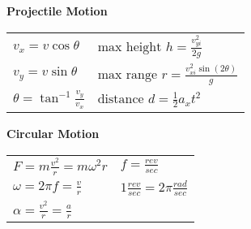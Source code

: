\documentclass[12pt]{article}
\begin{document}
\begin{minipage}[t]{.5\textwidth}
\textbf{\large{Projectile Motion}} \\[6pt]
	\begin{tabular}{p{3cm} p{6cm}}
	$v_x = v \cos \theta$ & $\text{max height   } h = \frac{v_{yi}^2}{2g}$ \\[6pt]
	$v_y = v \sin \theta$ & $\text{max range   } r = \frac{v_{xi}^2 \sin(2\theta)}{g}$ \\[6pt]
		
	$\theta = \tan ^{-1} \frac{v_y}{v_x}$ & $\text{distance    } d = \tfrac{1}{2} a_x t^2$ \\[6pt]
	\end{tabular}

\end{minipage}\vspace{12pt}

\begin{minipage}[t]{.5\textwidth}
\textbf{\large{Circular Motion}} \\[6pt]
\begin{tabular}{p{4cm} p{6cm}}
	$F=m \frac{v^2}{r}=m \omega^2 r$ & $f = \frac{rev}{sec}$ \\[6pt]
	$\omega = 2\pi f = \frac{v}{r}$ & $1 \frac{rev}{sec} = 2\pi \frac{rad}{sec}$\\[6pt]
	$\alpha = \frac{v^2}{r} = \frac{a}{r}$ & \\[12pt]
\end{tabular}		

\end{minipage}
\end{document}
